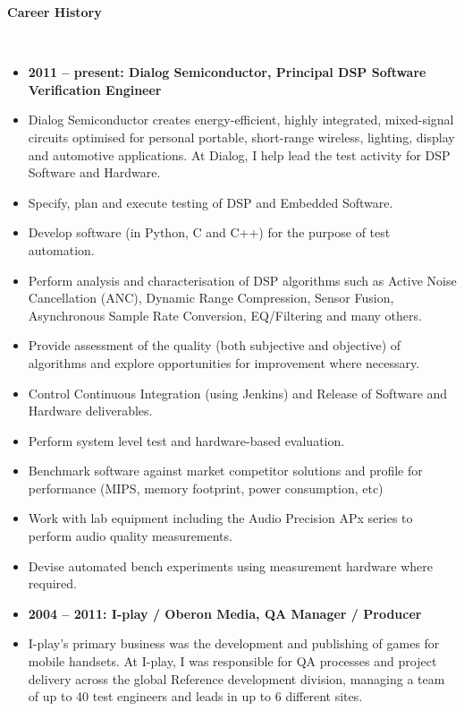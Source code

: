 \documentclass[a4paper,10pt]{article}
\newcommand{\lsep}{-0.5cm}
\newcommand{\resheading}[1]{{\small \colorbox{mygrey}{\begin{minipage}{0.975\textwidth}{\textbf{#1 \vphantom{p\^{E}}}}\end{minipage}}}}
\begin{document}
\resheading{\textbf{Career History}}\\[\lsep]

\begin{itemize}[align=left]
\item[] \textbf{2011 – present: Dialog Semiconductor, Principal DSP Software Verification Engineer}
\item[] Dialog Semiconductor creates energy-efficient, highly integrated,
  mixed-signal circuits optimised for personal portable, short-range wireless,
    lighting, display and automotive applications. At Dialog, I help lead the
    test activity for DSP Software and Hardware.
\\
\end{itemize}

\begin{itemize}[label=\FilledSmallSquare, leftmargin=50pt]
\item Specify, plan and execute testing of DSP and Embedded Software.
\item Develop software (in Python, C and C++) for the purpose of test automation.
\item Perform analysis and characterisation of DSP algorithms such as Active Noise Cancellation (ANC), Dynamic Range Compression, Sensor Fusion, Asynchronous Sample Rate Conversion, EQ/Filtering and many others.
\item Provide assessment of the quality (both subjective and objective) of algorithms and explore opportunities for improvement where necessary.
\item Control Continuous Integration (using Jenkins) and Release of Software and Hardware deliverables.
\item Perform system level test and hardware-based evaluation.
\item Benchmark software against market competitor solutions and profile for performance (MIPS, memory footprint, power consumption, etc)
\item Work with lab equipment including the Audio Precision APx series to perform audio quality measurements.
\item Devise automated bench experiments using measurement hardware where required.
\\
\end{itemize}

\begin{itemize}[align=left]
\item[] \textbf{2004 – 2011: I-play / Oberon Media, QA Manager / Producer}
\item[] I-play’s primary business was the development and publishing of games
  for mobile handsets. At I-play, I was responsible for QA processes and
    project delivery across the global Reference development division, managing
    a team of up to 40 test engineers and leads in up to 6 different sites.
\\
\end{itemize}
\end{document}
